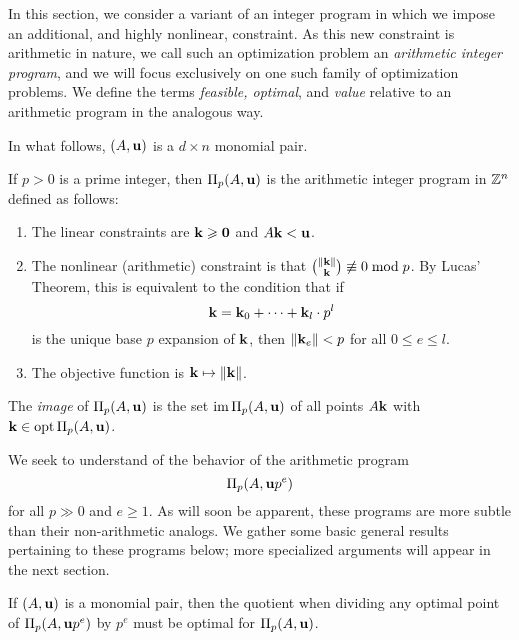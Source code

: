 \documentclass[11pt]{amsart}
\begin{document}

In this section, we consider a variant of an integer program in which we impose an additional, and {highly} nonlinear, constraint.  As this new constraint is arithmetic in nature, we call such an optimization problem an \emph{arithmetic integer program}, and we will focus exclusively on one such family of optimization problems.  We define the terms \emph{feasible, optimal}, and \emph{value} relative to an arithmetic program in the analogous way.   

In what follows, $(A, \mathbf{u})$ is a $d \times n$ monomial pair.


\begin{definition} If $p>0$ is a prime integer, then $\Pi_p(A, \mathbf{u})$ is the arithmetic integer program in $\mathbb{Z}^n$ defined as follows:
\begin{enumerate}
\item The linear constraints are $\mathbf{k} \geqslant \mathbf{0}$ and $A \mathbf{k} < \mathbf{u}$.  
\item The nonlinear (arithmetic) constraint is that $\binom{\| \mathbf{k} \|}{\mathbf{k}} \not \equiv 0 \bmod p$.  By Lucas' Theorem, this is equivalent to the condition that  if \[ \mathbf{k} = \mathbf{k}_0 + \cdots + \mathbf{k}_l \cdot  p^l\] is the unique base $p$ expansion of $\mathbf{k}$, then $\| \mathbf{k}_e \| < p$ for all $0 \leq e \leq l $.
\item The objective function is $\mathbf{k} \mapsto \| \mathbf{k} \|$.
\end{enumerate}

\end{definition}



\begin{definition}
The \emph{image} of $\Pi_p(A, \mathbf{u})$ is the set $\operatorname{im} \Pi_p(A, \mathbf{u})$ of all points  $A \mathbf{k}$ with $\mathbf{k} \in \operatorname{opt} \Pi_p(A, \mathbf{u})$. 
\end{definition}

We seek to understand of the behavior of the arithmetic program \[ \Pi_p(A, \mathbf{u}p^e)\] for all $p \gg 0$ and $e \geq 1$.    As will soon be apparent, these programs are more subtle than their non-arithmetic analogs.  We gather some basic general results pertaining to these programs below;  more specialized arguments will appear in the next section.

\begin{lemma} 
\label{optimal division: L}  If $(A, \mathbf{u})$ is a monomial pair, then the quotient when dividing any optimal point of $\Pi_p(A, \mathbf{u}p^e)$ by $p^e$ must be optimal for $\Pi_p(A, \mathbf{u})$.
\end{lemma}
\end{document}
